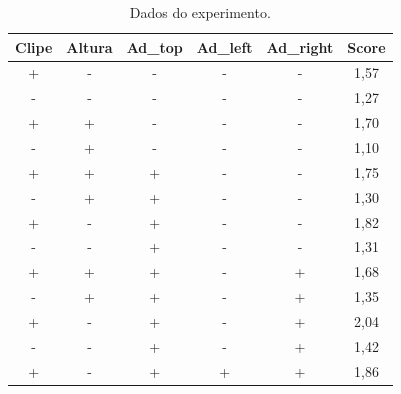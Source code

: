 \documentclass[
12pt,					%
openright,				%
oneside,				%
a4paper,				%
english,
brazil
]{ABNT/abntex2_report}
\begin{document}
\begin{table}[H]
	\centering
	\caption{Dados do experimento.}
	\begin{tabular}{|c|c|c|c|c|c|}
	\hline
	\rowcolor[HTML]{EFEFEF} 
	\textbf{Clipe} & \textbf{Altura} & \textbf{Ad\_top} & \textbf{Ad\_left} & \textbf{Ad\_right} & \textbf{Score} \\ \hline
	+              & -               & -                & -                 & -                  & 1,57           \\ \hline
	\rowcolor[HTML]{EFEFEF} 
	-              & -               & -                & -                 & -                  & 1,27           \\ \hline
	+              & +               & -                & -                 & -                  & 1,70           \\ \hline
	\rowcolor[HTML]{EFEFEF} 
	-              & +               & -                & -                 & -                  & 1,10           \\ \hline
	+              & +               & +                & -                 & -                  & 1,75           \\ \hline
	\rowcolor[HTML]{EFEFEF} 
	-              & +               & +                & -                 & -                  & 1,30           \\ \hline
	+              & -               & +                & -                 & -                  & 1,82           \\ \hline
	\rowcolor[HTML]{EFEFEF} 
	-              & -               & +                & -                 & -                  & 1,31           \\ \hline
	+              & +               & +                & -                 & +                  & 1,68           \\ \hline
	\rowcolor[HTML]{EFEFEF} 
	-              & +               & +                & -                 & +                  & 1,35           \\ \hline
	+              & -               & +                & -                 & +                  & 2,04           \\ \hline
	\rowcolor[HTML]{EFEFEF} 
	-              & -               & +                & -                 & +                  & 1,42           \\ \hline
	+              & -               & +                & +                 & +                  & 1,86           \\ \hline

\end{tabular}
\end{table}
\end{document}
